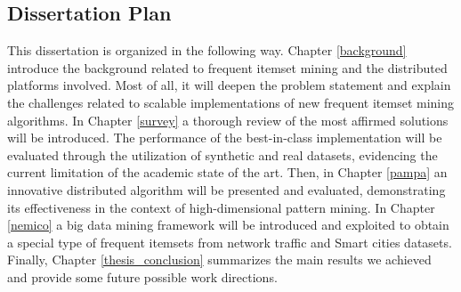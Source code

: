 \subsection{Dissertation Plan}
This dissertation is organized in the following way. Chapter \ref{background} introduce the background related to frequent itemset mining and the distributed platforms involved. Most of all, it will deepen the problem statement and explain the challenges related to scalable implementations of new frequent itemset mining algorithms.
In Chapter \ref{survey} a thorough review of the most affirmed solutions will be introduced. The performance of the best-in-class implementation will be evaluated through the utilization of synthetic and real datasets, evidencing the current limitation of the academic state of the art.
Then, in Chapter \ref{pampa} an innovative distributed algorithm will be presented and evaluated, demonstrating its effectiveness in the context of high-dimensional pattern mining.
In Chapter \ref{nemico} a big data mining framework will be introduced and exploited to obtain a special type of frequent itemsets from network traffic and Smart cities datasets.
Finally, Chapter \ref{thesis_conclusion} summarizes the main results we achieved and provide some future possible work directions. 



